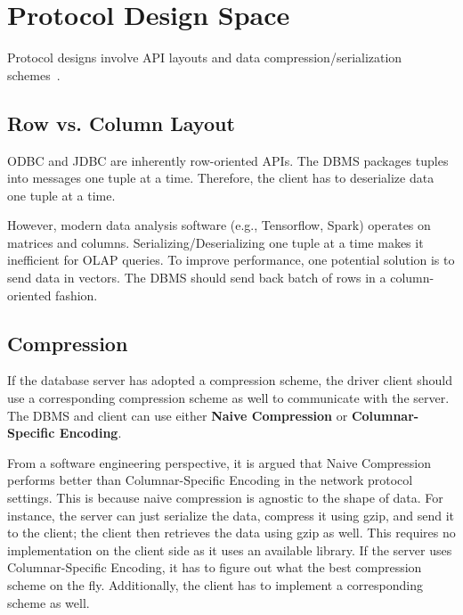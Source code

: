 \documentclass[11pt]{article}
\begin{document}
\section{Protocol Design Space}
Protocol designs involve API layouts and data compression/serialization schemes~\cite{p1022-muehleisen}.

\subsection*{Row vs. Column Layout}
ODBC and JDBC are inherently row-oriented APIs. The DBMS packages tuples into messages one tuple at a time. Therefore, the client has to deserialize data one tuple at a time. 

However, modern data analysis software (e.g., Tensorflow, Spark) operates on matrices and columns. Serializing/Deserializing one tuple at a time makes it inefficient for OLAP queries. To improve performance, one potential solution is to send data in vectors. The DBMS should send back batch of rows in a column-oriented fashion.

\subsection*{Compression}
If the database server has adopted a compression scheme, the driver client should use a corresponding compression scheme as well to communicate with the server. The DBMS and client can use either \textbf{Naive Compression} or \textbf{Columnar-Specific Encoding}.

From a software engineering perspective, it is argued that Naive Compression performs better than Columnar-Specific Encoding in the network protocol settings. This is because naive compression is agnostic to the shape of data. For instance, the server can just serialize the data, compress it using gzip, and send it to the client; the client then retrieves the data using gzip as well. This requires no implementation on the client side as it uses an available library. If the server uses Columnar-Specific Encoding, it has to figure out what the best compression scheme on the fly. Additionally, the client has to implement a corresponding scheme as well. 
\end{document}
